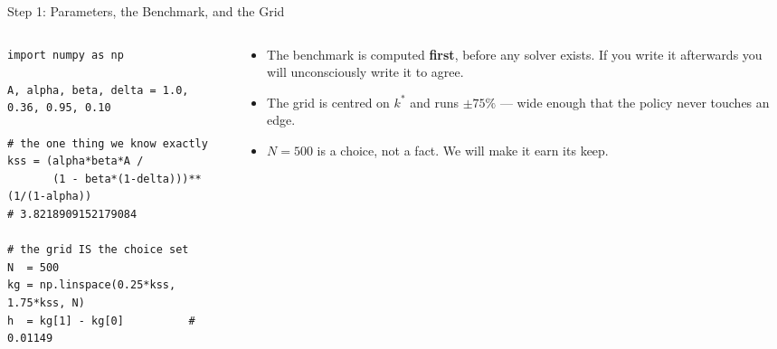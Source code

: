 \begin{frame}[fragile]{Step 1: Parameters, the Benchmark, and the Grid}
\begin{columns}[T]
\begin{column}{0.55\textwidth}
\begin{lstlisting}
import numpy as np

A, alpha, beta, delta = 1.0, 0.36, 0.95, 0.10

# the one thing we know exactly
kss = (alpha*beta*A /
       (1 - beta*(1-delta)))**(1/(1-alpha))
# 3.8218909152179084

# the grid IS the choice set
N  = 500
kg = np.linspace(0.25*kss, 1.75*kss, N)
h  = kg[1] - kg[0]          # 0.01149
\end{lstlisting}
\end{column}
\begin{column}{0.42\textwidth}
\small
\begin{itemize}\footnotesize
  \item The benchmark is computed \textbf{first}, before any solver exists. If you write it afterwards you will unconsciously write it to agree.
  \item The grid is centred on $k^{*}$ and runs $\pm75\%$ --- wide enough that the policy never touches an edge.
  \item $N=500$ is a choice, not a fact. We will make it earn its keep.
\end{itemize}
\end{column}
\end{columns}
\end{frame}

